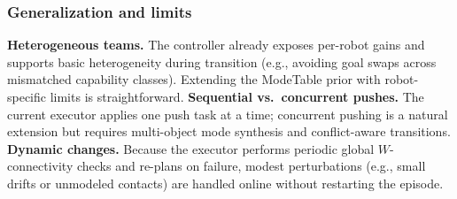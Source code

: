 \subsubsection{Generalization and limits}\label{subsec:general}
\textbf{Heterogeneous teams.} The controller already exposes per-robot gains and
supports basic heterogeneity during transition (e.g., avoiding goal swaps across
mismatched capability classes). Extending the ModeTable prior with robot-specific
limits is straightforward. \textbf{Sequential vs.\ concurrent pushes.} The current
executor applies one push task at a time; concurrent pushing is a natural extension
but requires multi-object mode synthesis and conflict-aware transitions. \textbf{Dynamic
changes.} Because the executor performs periodic global $W$-connectivity checks and
re-plans on failure, modest perturbations (e.g., small drifts or unmodeled contacts)
are handled online without restarting the episode.